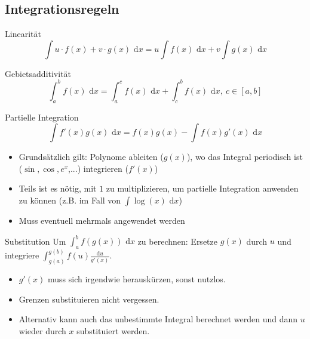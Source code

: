 \documentclass[a4paper,10pt]{article}
\def\dx{\text{ d}x}
\begin{document}
\subsection{Integrationsregeln}
\begin{subbox}{Linearität}
 \vspace{-12pt}
 $$\int u\cdot f(x) + v \cdot g(x) \dx = u \int f(x) \dx + v \int g(x) \dx$$
\end{subbox}
\begin{subbox}{Gebietsadditivität}
 \vspace{-12pt}
 $$\int_a^b f(x) \dx = \int_a^c f(x) \dx + \int_c^b f(x) \dx, \ c \in [a,b]$$
\end{subbox}
\begin{mainbox}{Partielle Integration}
 \vspace{-12pt}
 $$\int f'(x) g(x) \dx = f(x)g(x) - \int f(x) g'(x) \dx$$
\end{mainbox}
\begin{itemize}
 \item Grundsätzlich gilt: Polynome ableiten ($g(x)$), wo das Integral periodisch ist ($\sin, \cos, e^x$,...) integrieren ($f'(x)$)
 \item Teils ist es nötig, mit $1$ zu multiplizieren, um partielle Integration anwenden zu können (z.B. im Fall von $\int \log(x) \dx$)
 \item Muss eventuell mehrmals angewendet werden
\end{itemize}
\begin{mainbox}{Substitution}
 Um $\int_a^b f(g(x)) \dx$ zu berechnen: Ersetze $g(x)$ durch $u$ und integriere $\int_{g(a)}^{g(b)} f(u) \frac{\text{d}u}{g'(x)}$.
\end{mainbox}
\begin{itemize}
 \item $g'(x)$ muss sich irgendwie herauskürzen, sonst nutzlos.
 \item Grenzen substituieren nicht vergessen.
 \item Alternativ kann auch das unbestimmte Integral berechnet werden und dann $u$ wieder durch $x$ substituiert werden.
\end{itemize}
\end{document}

